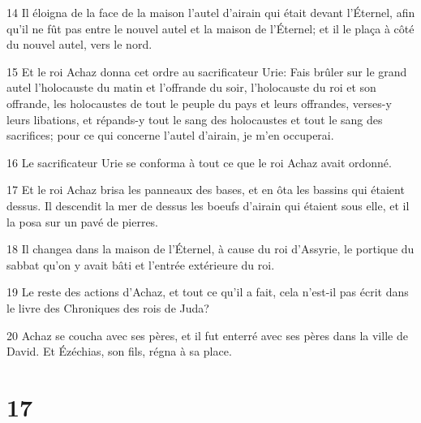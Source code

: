 \par 14 Il éloigna de la face de la maison l'autel d'airain qui était devant l'Éternel, afin qu'il ne fût pas entre le nouvel autel et la maison de l'Éternel; et il le plaça à côté du nouvel autel, vers le nord.
\par 15 Et le roi Achaz donna cet ordre au sacrificateur Urie: Fais brûler sur le grand autel l'holocauste du matin et l'offrande du soir, l'holocauste du roi et son offrande, les holocaustes de tout le peuple du pays et leurs offrandes, verses-y leurs libations, et répands-y tout le sang des holocaustes et tout le sang des sacrifices; pour ce qui concerne l'autel d'airain, je m'en occuperai.
\par 16 Le sacrificateur Urie se conforma à tout ce que le roi Achaz avait ordonné.
\par 17 Et le roi Achaz brisa les panneaux des bases, et en ôta les bassins qui étaient dessus. Il descendit la mer de dessus les boeufs d'airain qui étaient sous elle, et il la posa sur un pavé de pierres.
\par 18 Il changea dans la maison de l'Éternel, à cause du roi d'Assyrie, le portique du sabbat qu'on y avait bâti et l'entrée extérieure du roi.
\par 19 Le reste des actions d'Achaz, et tout ce qu'il a fait, cela n'est-il pas écrit dans le livre des Chroniques des rois de Juda?
\par 20 Achaz se coucha avec ses pères, et il fut enterré avec ses pères dans la ville de David. Et Ézéchias, son fils, régna à sa place.

\chapter{17}


